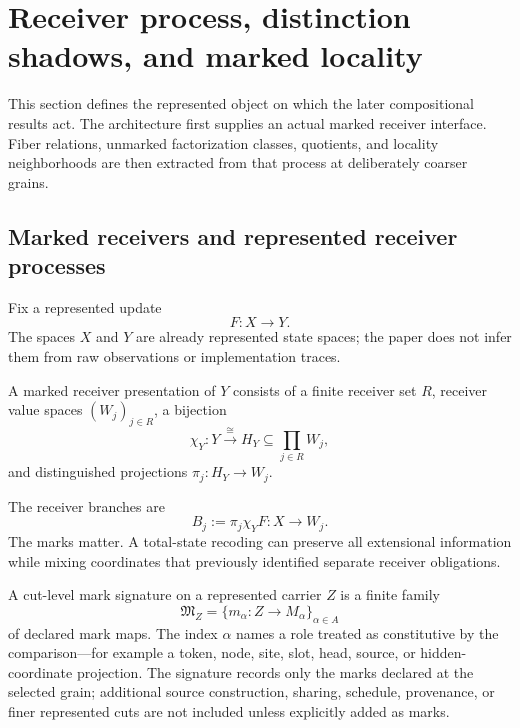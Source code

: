 \section{Receiver process, distinction shadows, and marked locality}\label{sec:receiver-access}

This section defines the represented object on which the later compositional results act. The architecture first supplies an actual marked receiver interface. Fiber relations, unmarked factorization classes, quotients, and locality neighborhoods are then extracted from that process at deliberately coarser grains.

\subsection{Marked receivers and represented receiver processes}

Fix a represented update
\[
F:X\to Y.
\]
The spaces $X$ and $Y$ are already represented state spaces; the paper does not infer them from raw observations or implementation traces.

\begin{definition}\label{def:marked-receiver-presentation-v13}
A marked receiver presentation of $Y$ consists of a finite receiver set $R$, receiver value spaces $(W_j)_{j\in R}$, a bijection
\[
\chi_Y:Y\xrightarrow{\cong}H_Y\subseteq\prod_{j\in R}W_j,
\]
and distinguished projections $\pi_j:H_Y\to W_j$.
\end{definition}

The receiver branches are
\[
B_j:=\pi_j\chi_YF:X\to W_j.
\]
The marks matter. A total-state recoding can preserve all extensional information while mixing coordinates that previously identified separate receiver obligations.

\begin{definition}\label{def:cut-mark-signature-v15}
A cut-level mark signature on a represented carrier $Z$ is a finite family
\[
\mathfrak M_Z=\{m_\alpha:Z\to M_\alpha\}_{\alpha\in A}
\]
of declared mark maps. The index $\alpha$ names a role treated as constitutive by the comparison---for example a token, node, site, slot, head, source, or hidden-coordinate projection. The signature records only the marks declared at the selected grain; additional source construction, sharing, schedule, provenance, or finer represented cuts are not included unless explicitly added as marks.
\end{definition}

